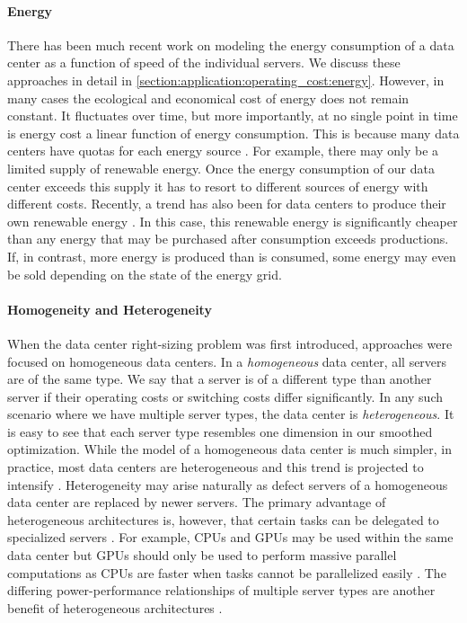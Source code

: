 \paragraph{Energy} There has been much recent work on modeling the energy consumption of a data center as a function of speed of the individual servers. We discuss these approaches in detail in \autoref{section:application:operating_cost:energy}. However, in many cases the ecological and economical cost of energy does not remain constant. It fluctuates over time, but more importantly, at no single point in time is energy cost a linear function of energy consumption. This is because many data centers have quotas for each energy source \cite{Miller2021}. For example, there may only be a limited supply of renewable energy. Once the energy consumption of our data center exceeds this supply it has to resort to different sources of energy with different costs. Recently, a trend has also been for data centers to produce their own renewable energy \cite{Lin2012}. In this case, this renewable energy is significantly cheaper than any energy that may be purchased after consumption exceeds productions. If, in contrast, more energy is produced than is consumed, some energy may even be sold depending on the state of the energy grid.

\paragraph{Homogeneity and Heterogeneity} When the data center right-sizing problem was first introduced, approaches were focused on homogeneous data centers. In a \textit{homogeneous} data center, all servers are of the same type. We say that a server is of a different type than another server if their operating costs or switching costs differ significantly. In any such scenario where we have multiple server types, the data center is \textit{heterogeneous}. It is easy to see that each server type resembles one dimension in our smoothed optimization. While the model of a homogeneous data center is much simpler, in practice, most data centers are heterogeneous and this trend is projected to intensify \cite{Jin2016}. Heterogeneity may arise naturally as defect servers of a homogeneous data center are replaced by newer servers. The primary advantage of heterogeneous architectures is, however, that certain tasks can be delegated to specialized servers \cite{Jin2016}. For example, CPUs and GPUs may be used within the same data center but GPUs should only be used to perform massive parallel computations as CPUs are faster when tasks cannot be parallelized easily \cite{Shan2006}. The differing power-performance relationships of multiple server types are another benefit of heterogeneous architectures \cite{Jin2016}.

